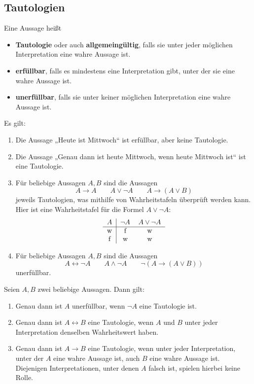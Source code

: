 \subsection*{Tautologien}


\begin{defin} 
    Eine Aussage heißt
    \begin{itemize}
        \item \textbf{Tautologie} oder auch \textbf{allgemeingültig}, falls sie unter jeder möglichen Interpretation eine wahre Aussage ist.
        \item \textbf{erfüllbar}, falls es mindestens eine Interpretation gibt, unter der sie eine wahre Aussage ist.
        \item \textbf{unerfüllbar}, falls sie unter keiner möglichen Interpretation eine wahre Aussage ist.
    \end{itemize}
\end{defin}


\begin{bsp}
    Es gilt:
    \begin{enumerate}
        \item Die Aussage „Heute ist Mittwoch“ ist erfüllbar, aber keine Tautologie.
        \item Die Aussage „Genau dann ist heute Mittwoch, wenn heute Mittwoch ist“ ist eine Tautologie.
        \item Für beliebige Aussagen $A,B$ sind die Aussagen
            \[ A \to A \qquad A\lor \neg A  \qquad A \to (A\lor B) \]
        jeweils Tautologien, was mithilfe von Wahrheitstafeln überprüft werden kann. Hier ist eine Wahrheitstafel für die Formel $A\lor \neg A$:
        \[\begin{tabular}{c|cc}
            $A$ & $\neg A$ & $A\lor \neg A$ \\
            \hline
            w&f&w\\
            f&w&w
        \end{tabular}\]
        \item Für beliebige Aussagen $A,B$ sind die Aussagen
            \[ A \leftrightarrow \neg A \qquad A\land \neg A \qquad  \neg(A\to (A\lor B))\]
        unerfüllbar.
    \end{enumerate}
\end{bsp}
 
 
\begin{satz} \label{tauto}
    Seien $A,B$ zwei beliebige Aussagen. Dann gilt:
    \begin{enumerate}
        \item Genau dann ist $A$ unerfüllbar, wenn $\neg A$ eine Tautologie ist.
        \item Genau dann ist $A\leftrightarrow B$ eine Tautologie, wenn $A$ und $B$ unter jeder Interpretation denselben Wahrheitswert haben.
        \item Genau dann ist $A\to B$ eine Tautologie, wenn unter jeder Interpretation, unter der $A$ eine wahre Aussage ist, auch $B$ eine wahre Aussage ist. Diejenigen Interpretationen, unter denen $A$ falsch ist, spielen hierbei keine Rolle.
    \end{enumerate}
\end{satz}


